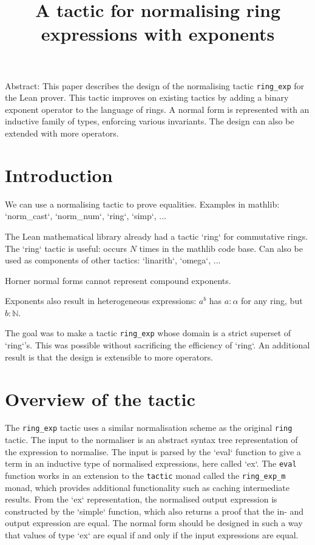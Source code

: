 \documentclass{llncs}
\title{A tactic for normalising ring expressions with exponents}
\newcommand{\lean}[1]{\texttt{#1}\xspace} %
\newcommand{\ring}{\lean{ring}}
\newcommand{\ringexp}{\lean{ring\_exp}}
\begin{document}
\maketitle

Abstract:
This paper describes the design of the normalising tactic \ringexp for the Lean prover.
This tactic improves on existing tactics by adding a binary exponent operator to the language of rings.
A normal form is represented with an inductive family of types, enforcing various invariants.
The design can also be extended with more operators.

\section{Introduction}

We can use a normalising tactic to prove equalities.
Examples in mathlib: `norm\_cast`, `norm\_num`, `ring`, `simp`, ...

The Lean mathematical library already had a tactic `ring` for commutative rings.
The `ring` tactic is useful: occurs $N$ times in the mathlib code base.
Can also be used as components of other tactics: `linarith`, `omega`, ...

Horner normal forms cannot represent compound exponents.

Exponents also result in heterogeneous expressions: $a^b$ has $a : α$ for any ring, but $b : ℕ$.

The goal was to make a tactic \ringexp whose domain is a strict superset of `ring`'s.
This was possible without sacrificing the efficiency of `ring`.
An additional result is that the design is extensible to more operators.

\section{Overview of the tactic}

The \ringexp tactic uses a similar normalisation scheme as the original \ring tactic.
The input to the normaliser is an abstract syntax tree representation of the expression to normalise.
The input is parsed by the `eval` function to give a term in an inductive type of normalised expressions, here called `ex`.
The \lean{eval} function works in an extension to the \lean{tactic} monad called the \lean{ring\_exp\_m} monad,
which provides additional functionality such as caching intermediate results.
From the `ex` representation, the normalised output expression is constructed by the `simple` function,
which also returns a proof that the in- and output expression are equal.
The normal form should be designed in such a way that values of type `ex` are equal if and only if the input expressions are equal.
\end{document}
